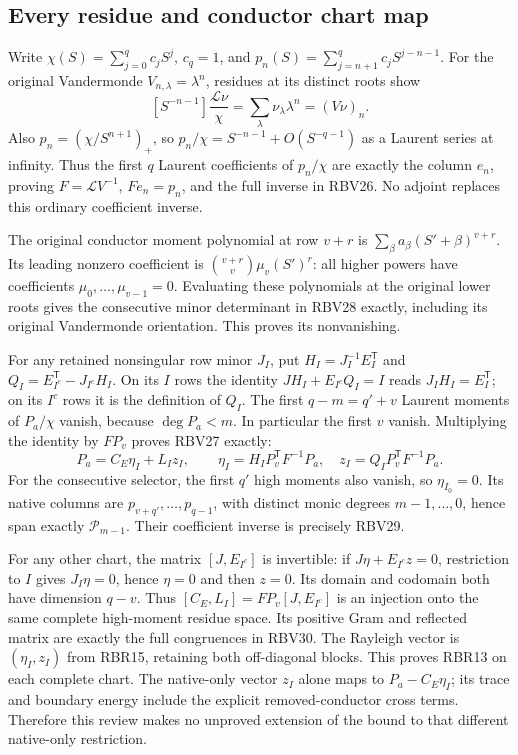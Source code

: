 \subsection{Every residue and conductor chart map}

Write $\chi(S)=\sum_{j=0}^qc_jS^j$, $c_q=1$, and
$p_n(S)=\sum_{j=n+1}^qc_jS^{j-n-1}$.
For the original Vandermonde
$V_{n,\lambda}=\lambda^n$, residues at its distinct roots show
\[
 [S^{-n-1}]\frac{\mathcal L\nu}{\chi}
       =\sum_\lambda\nu_\lambda\lambda^n=(V\nu)_n .
 \tag{RBR14}
\]
Also $p_n=(\chi/S^{n+1})_+$, so
$p_n/\chi=S^{-n-1}+O(S^{-q-1})$ as a Laurent series at infinity.
Thus the first $q$ Laurent coefficients of $p_n/\chi$ are
exactly the column $e_n$, proving
$F=\mathcal LV^{-1}$, $Fe_n=p_n$, and the full inverse in RBV26.
No adjoint replaces this ordinary coefficient inverse.

The original conductor moment polynomial at row $v+r$ is
$\sum_\beta a_\beta(S'+\beta)^{v+r}$.
Its leading nonzero coefficient is
$\binom{v+r}{v}\mu_v(S')^r$: all higher powers have coefficients
$\mu_0,\ldots,\mu_{v-1}=0$.
Evaluating these polynomials at the original lower roots gives
the consecutive minor determinant in RBV28 exactly, including
its original Vandermonde orientation. This proves its nonvanishing.

For any retained nonsingular row minor $J_I$, put
$H_I=J_I^{-1}E_I^{\mathsf T}$ and
$Q_I=E_{I^c}^{\mathsf T}-J_{I^c}H_I$.
On its $I$ rows the identity
$JH_I+E_{I^c}Q_I=I$ reads $J_IH_I=E_I^{\mathsf T}$;
on its $I^c$ rows it is the definition of $Q_I$.
The first $q-m=q'+v$ Laurent moments of $P_a/\chi$ vanish,
because $\deg P_a<m$. In particular the first $v$ vanish.
Multiplying the identity by $FP_v$ proves RBV27 exactly:
\[
 P_a=C_E\eta_I+L_Iz_I,\qquad
 \eta_I=H_IP_v^{\mathsf T}F^{-1}P_a,\quad
 z_I=Q_IP_v^{\mathsf T}F^{-1}P_a .                   \tag{RBR15}
\]
For the consecutive selector, the first $q'$ high moments also
vanish, so $\eta_{I_0}=0$.
Its native columns are $p_{v+q'},\ldots,p_{q-1}$, with distinct
monic degrees $m-1,\ldots,0$, hence span exactly $\mathcal P_{m-1}$.
Their coefficient inverse is precisely RBV29.

For any other chart, the matrix $[J,E_{I^c}]$ is invertible:
if $J\eta+E_{I^c}z=0$, restriction to $I$ gives
$J_I\eta=0$, hence $\eta=0$ and then $z=0$.
Its domain and codomain both have dimension $q-v$.
Thus $[C_E,L_I]=FP_v[J,E_{I^c}]$ is an injection onto the
same complete high-moment residue space.
Its positive Gram and reflected matrix are exactly the full
congruences in RBV30. The Rayleigh vector is
$(\eta_I,z_I)$ from RBR15, retaining both off-diagonal blocks.
This proves RBR13 on each complete chart.
The native-only vector $z_I$ alone maps to
$P_a-C_E\eta_I$; its trace and boundary energy include the
explicit removed-conductor cross terms. Therefore this review
makes no unproved extension of the bound to that different
native-only restriction.

